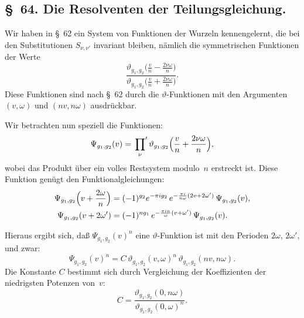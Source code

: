 \documentclass[11pt,a4paper]{article}
\theoremstyle{plain}
\theoremstyle{remark}
\begin{document}
\subsection*{§~64. Die Resolventen der Teilungsgleichung.}

Wir haben in §~62 ein System von Funktionen der Wurzeln
kennengelernt, die bei den Substitutionen $S_{\nu,\nu'}$
invariant bleiben, nämlich die symmetrischen Funktionen der
Werte
\[
\frac{\vartheta_{g_1,g_2}\bigl(\frac{v}{n}-\frac{2\nu\omega}{n}\bigr)}
     {\vartheta_{g_1,g_2}\bigl(\frac{v}{n}+\frac{2\nu\omega}{n}\bigr)}.
\]
Diese Funktionen sind nach §~62 durch die
$\vartheta$-Funktionen mit den Argumenten $(v,\omega)$ und
$(nv,n\omega)$ ausdrückbar.

Wir betrachten nun speziell die Funktionen:
\begin{equation}\label{eq:64:1}
\Psi_{g_1,g_2}(v) = \sideset{}{'}\prod_{\nu}
\vartheta_{g_1,g_2}\Bigl(\frac{v}{n}+\frac{2\nu\omega}{n}\Bigr),
\end{equation}
wobei das Produkt über ein volles Restsystem modulo~$n$
erstreckt ist. Diese Funktion genügt den
Funktionalgleichungen:
\begin{align}
\Psi_{g_1,g_2}\Bigl(v+\frac{2\omega}{n}\Bigr)
&= (-1)^{g_2} e^{-\pi i g_2}\,
   e^{-\frac{\pi i}{n\omega}(2v+2\omega')}\,
   \Psi_{g_1,g_2}(v), \label{eq:64:2a}\\
\Psi_{g_1,g_2}(v+2\omega')
&= (-1)^{n g_1}\,
   e^{-\frac{\pi i n}{\omega}(v+\omega')}\,
   \Psi_{g_1,g_2}(v). \label{eq:64:2b}
\end{align}

Hieraus ergibt sich, daß $\Psi_{g_1,g_2}(v)^n$ eine
$\vartheta$-Funktion ist mit den Perioden $2\omega$, $2\omega'$,
und zwar:
\begin{equation}\label{eq:64:3}
\Psi_{g_1,g_2}(v)^n = C\,\vartheta_{g_1,g_2}(v,\omega)^n\,
\vartheta_{g_1,g_2}(nv,n\omega).
\end{equation}
Die Konstante $C$ bestimmt sich durch Vergleichung der
Koeffizienten der niedrigsten Potenzen von~$v$:
\begin{equation}\label{eq:64:4}
C = \frac{\vartheta_{g_1,g_2}(0,n\omega)}
        {\vartheta_{g_1,g_2}(0,\omega)^n}.
\end{equation}


\end{document}
